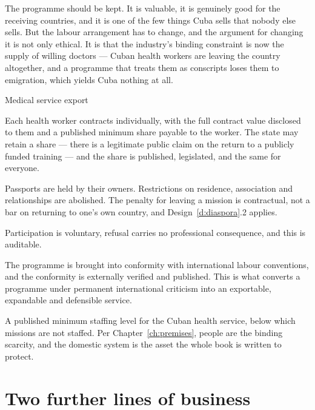 The programme should be kept. It is valuable, it is genuinely good for the
receiving countries, and it is one of the few things Cuba sells that nobody else
sells. But the labour arrangement has to change, and the argument for changing it
is not only ethical. It is that the industry's binding constraint is now the
supply of willing doctors --- Cuban health workers are leaving the country
altogether, and a programme that treats them as conscripts loses them to
emigration, which yields Cuba nothing at all.

\begin{design}{Medical service export}
\label{d:missions}
\begin{rules}
 Each health worker contracts individually, with the
full contract value disclosed to them and a published minimum share payable to
the worker. The state may retain a share --- there is a legitimate public claim on
the return to a publicly funded training --- and the share is published,
legislated, and the same for everyone.

 Passports are held by their owners.
Restrictions on residence, association and relationships are abolished. The
penalty for leaving a mission is contractual, not a bar on returning to one's
own country, and Design~\ref{d:diaspora}.2 applies.

 Participation is voluntary, refusal carries no professional
consequence, and this is auditable.

 The programme is brought into conformity
with international labour conventions, and the conformity is externally verified
and published. This is what converts a programme under permanent international
criticism into an exportable, expandable and defensible service.

 A published minimum staffing level for the Cuban
health service, below which missions are not staffed. Per
Chapter~\ref{ch:premises}, people are the binding scarcity, and the domestic
system is the asset the whole book is written to protect.
\end{rules}
\end{design}

\section{Two further lines of business}

